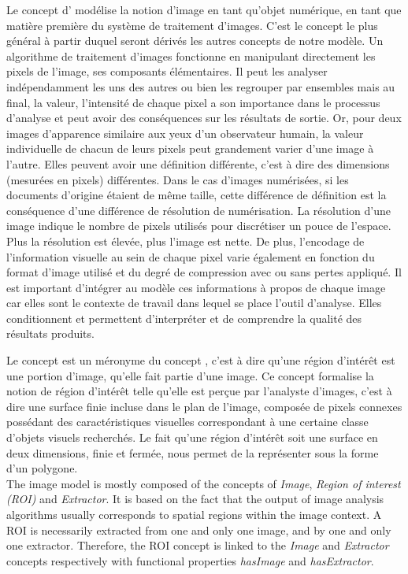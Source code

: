 Le concept d' modélise la notion d'image en tant qu'objet numérique, en tant que matière première du système de traitement d'images.
C'est le concept le plus général à partir duquel seront dérivés les autres concepts de notre modèle.
Un algorithme de traitement d'images fonctionne en manipulant directement les pixels de l'image, ses composants élémentaires.
Il peut les analyser indépendamment les uns des autres ou bien les regrouper par ensembles mais au final, la valeur, l'intensité de chaque pixel a son importance dans le processus d'analyse et peut avoir des conséquences sur les résultats de sortie.
Or, pour deux images d'apparence similaire aux yeux d'un observateur humain, la valeur individuelle de chacun de leurs pixels peut grandement varier d'une image à l'autre.
Elles peuvent avoir une définition différente, c'est à dire des dimensions (mesurées en pixels) différentes.
Dans le cas d'images numérisées, si les documents d'origine étaient de même taille, cette différence de définition est la conséquence d'une différence de résolution de numérisation.
La résolution d'une image indique le nombre de pixels utilisés pour discrétiser un pouce de l'espace.
Plus la résolution est élevée, plus l'image est nette.
De plus, l'encodage de l'information visuelle au sein de chaque pixel varie également en fonction du format d'image utilisé et du degré de compression avec ou sans pertes appliqué.
Il est important d'intégrer au modèle ces informations à propos de chaque image car elles sont le contexte de travail dans lequel se place l'outil d'analyse.
Elles conditionnent et permettent d'interpréter et de comprendre la qualité des résultats produits.


Le concept  est un méronyme du concept , c'est à dire qu'une région d'intérêt est une portion d'image, qu'elle fait partie d'une image.
Ce concept formalise la notion de région d'intérêt telle qu'elle est perçue par l'analyste d'images, c'est à dire une surface finie incluse dans le plan de l'image, composée de pixels connexes possédant des caractéristiques visuelles correspondant à une certaine classe d'objets visuels recherchés.
Le fait qu'une région d'intérêt soit une surface en deux dimensions, finie et fermée, nous permet de la représenter sous la forme d'un polygone.\\

The image model is mostly composed of the concepts of \textit{Image}, \textit{Region of interest (ROI)} and \textit{Extractor}.
It is based on the fact that the output of image analysis algorithms usually corresponds to spatial regions within the image context.
A ROI is necessarily extracted from one and only one image, and by one and only one extractor.
Therefore, the ROI concept is linked to the \textit{Image} and \textit{Extractor} concepts respectively with functional properties \textit{hasImage} and \textit{hasExtractor}.

